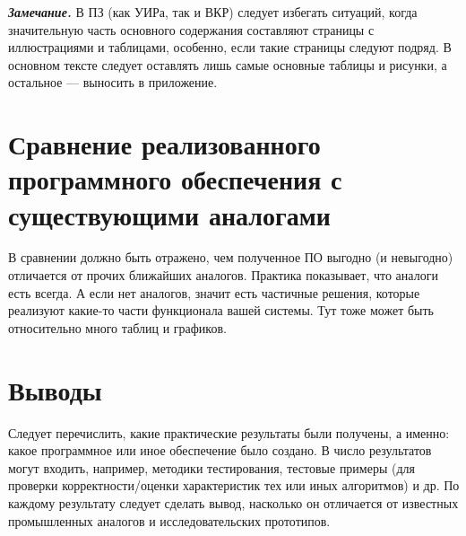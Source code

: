 \textit{\textbf{Замечание.}} В ПЗ (как УИРа, так и ВКР) следует избегать ситуаций, когда значительную часть основного содержания составляют страницы с иллюстрациями и таблицами, особенно, если такие страницы следуют подряд. В основном тексте следует оставлять лишь самые основные таблицы и рисунки, а остальное --- выносить в приложение.




\section{Сравнение реализованного программного обеспечения с существующими аналогами}

В сравнении должно быть отражено, чем полученное ПО выгодно (и невыгодно) отличается от прочих ближайших аналогов. Практика показывает, что аналоги есть всегда. А если нет аналогов, значит есть частичные решения, которые реализуют какие-то части функционала вашей системы. Тут тоже может быть относительно много таблиц и графиков.



\section{Выводы}

Следует перечислить, какие практические результаты были получены, а именно: какое программное или иное обеспечение было создано. В число результатов могут входить, например, методики тестирования, тестовые примеры (для проверки корректности/оценки характеристик тех или иных алгоритмов) и др. По каждому результату следует сделать вывод, насколько он отличается от известных промышленных аналогов и исследовательских прототипов.

